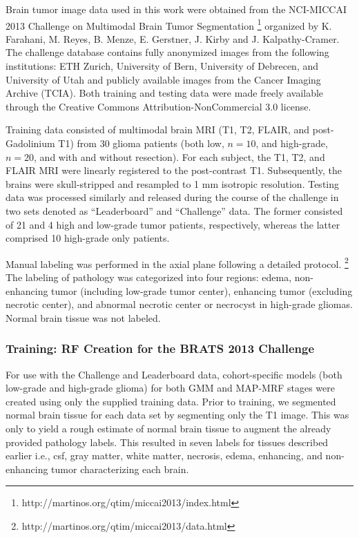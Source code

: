 \documentclass[preprint,authoryear,review,12pt]{elsarticle}
\begin{document}
{Brain tumor image data used in this work were obtained from the NCI-MICCAI 2013 
Challenge on Multimodal Brain Tumor Segmentation%
\footnote{
http://martinos.org/qtim/miccai2013/index.html
}
organized by K. Farahani, M. Reyes, B. Menze, E. Gerstner, J. Kirby and J. Kalpathy-Cramer. 
The challenge database contains fully anonymized images from the following institutions: 
ETH Zurich, University of Bern, University of Debrecen, and University of Utah and 
publicly available images from the Cancer Imaging Archive (TCIA).  Both training 
and testing data were made freely available through the Creative Commons Attribution-NonCommercial 3.0 license.

Training data consisted of multimodal brain MRI (T1, T2, FLAIR, and 
post-Gadolinium T1) from 30 glioma patients (both low, $n=10$, and high-grade, $n=20$,
and with and without resection).  For each subject, the T1, T2, and 
FLAIR MRI were linearly registered to the post-contrast T1.  Subsequently,
the brains were skull-stripped and resampled to 1 mm isotropic resolution.
Testing data was processed similarly and released during the course of the
challenge in two sets denoted as ``Leaderboard'' and ``Challenge'' data.  
The former consisted of 21 and 4 high and low-grade tumor patients, respectively,
whereas the latter comprised 10 high-grade only patients.

Manual labeling was performed in the axial plane following a detailed
protocol.%
\footnote{
http://martinos.org/qtim/miccai2013/data.html
}
The labeling of pathology was categorized into four regions:
edema, non-enhancing tumor (including low-grade tumor center), 
enhancing tumor (excluding necrotic center), and abnormal
necrotic center or necrocyst in high-grade gliomas.
Normal brain tissue was not labeled. 

\subsubsection{Training: RF Creation for the BRATS 2013 Challenge}

For use with the Challenge and Leaderboard data, cohort-specific models (both 
low-grade and 
high-grade glioma) for both GMM and MAP-MRF stages were created using only the 
supplied training data.  Prior to training, we segmented normal brain tissue \citep{avants2011}
for each data set by segmenting only the T1 image.  This was only to yield
a rough estimate of normal brain tissue to augment the already provided 
pathology labels.  This resulted in seven labels for tissues described
earlier i.e., csf, gray matter, white matter,
necrosis, edema, enhancing, and non-enhancing tumor characterizing each brain.

}
\end{document}
